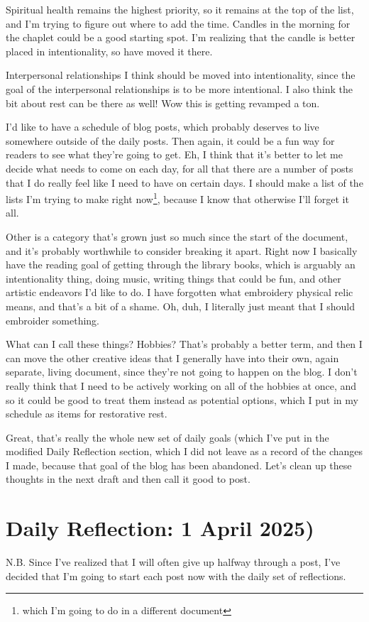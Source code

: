 \documentclass[12pt]{article}[titlepage]
\renewcommand{\,}{\textsuperscript{,}}
\begin{document}
Spiritual health remains the highest priority, so it remains at the top of the list, and I'm trying to figure out where to add the time.  
Candles in the morning for the chaplet could be a good starting spot.  
I'm realizing that the candle is better placed in intentionality, so have moved it there.

Interpersonal relationships I think should be moved into intentionality, since the goal of the interpersonal relationships is to be more intentional.  
I also think the bit about rest can be there as well!  
Wow this is getting revamped a ton.

I'd like to have a schedule of blog posts, which probably deserves to live somewhere outside of the daily posts. Then again, it could be a fun way for readers to see what they're going to get.  
Eh, I think that it's better to let me decide what needs to come on each day, for all that there are a number of posts that I do really feel like I need to have on certain days.  
I should make a list of the lists I'm trying to make right now\footnote{which I'm going to do in a different document}, because I know that otherwise I'll forget it all.

Other is a category that's grown just so much since the start of the document, and it's probably worthwhile to consider breaking it apart.  
Right now I basically have the reading goal of getting through the library books, which is arguably an intentionality thing, doing music, writing things that could be fun, and other artistic endeavors I'd like to do.  
I have forgotten what embroidery physical relic means, and that's a bit of a shame.  
Oh, duh, I literally just meant that I should embroider something.

What can I call these things? Hobbies? That's probably a better term, and then I can move the other creative ideas that I generally have into their own, again separate, living document, since they're not going to happen on the blog.  
I don't really think that I need to be actively working on all of the hobbies at once, and so it could be good to treat them instead as potential options, which I put in my schedule as items for restorative rest.

Great, that's really the whole new set of daily goals (which I've put in the modified Daily Reflection section, which I did not leave as a record of the changes I made, because that goal of the blog has been abandoned.  
Let's clean up these thoughts in the next draft and then call it good to post.

\section{Daily Reflection: 1 April 2025)}  
N.B. Since I've realized that I will often give up halfway through a post, I've decided that I'm going to start each post now with the daily set of reflections.
\end{document}
